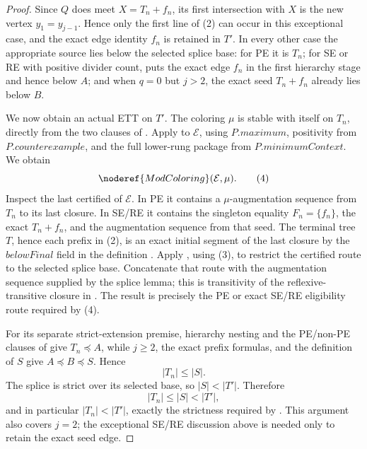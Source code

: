 \begin{proof}
Since \(Q\) does meet \(X=T_n+f_n\), its first intersection with \(X\)
is the new vertex \(y_1=y_{j-1}\).  Hence only the first line of (2) can
occur in this exceptional case, and the exact edge identity \(f_n\) is
retained in \(T'\).  In every other case the appropriate source lies
below the selected splice base: for PE it is \(T_n\); for SE or RE with
positive divider count,  puts the
exact edge \(f_n\) in the first hierarchy stage and hence below \(A\);
and when \(q=0\) but \(j>2\), the exact seed \(T_n+f_n\) already lies
below \(B\).                                                     

We now obtain an actual ETT on \(T'\).  The coloring \(\mu\) is stable
with itself on \(T_n\), directly from the two clauses of
.  Apply  to \(\mathcal E\), using
\(P.\mathit{maximum}\), positivity from
\(P.\mathit{counterexample}\), and the full lower-rung package from
\(P.\mathit{minimumContext}\).  We obtain
\[
                         \noderef{ModColoring}(\mathcal E,\mu).\tag{4}
\]
Inspect the last certified  of \(\mathcal E\).
In PE it contains a \(\mu\)-augmentation sequence from \(T_n\) to its
last closure.  In SE/RE it contains the singleton equality
\(F_n=\{f_n\}\), the exact 
\(T_n+f_n\), and the augmentation sequence from that seed.  The terminal
tree \(T\), hence each prefix in (2), is an exact initial segment of the
last closure by the \(\mathit{belowFinal}\) field in the definition
.  Apply
, using (3), to restrict
the certified route to the selected splice base.  Concatenate that route
with the augmentation sequence supplied by the splice lemma; this is
transitivity of the reflexive-transitive closure in
.  The result is precisely the PE
or exact SE/RE eligibility route required by (4).

For its separate strict-extension premise, hierarchy nesting and the
PE/non-PE clauses of  give
\(T_n\preccurlyeq A\), while \(j\ge2\), the exact prefix formulas, and the
definition of \(S\) give \(A\preccurlyeq B\preccurlyeq S\).  Hence
\[
                         |T_n|\le |S|.
\]
The splice is strict over its selected base, so \(|S|<|T'|\).  Therefore
\[
                         |T_n|\le |S|<|T'|,
\]
and in particular \(|T_n|<|T'|\), exactly the strictness required by
.  This argument also covers \(j=2\); the exceptional
SE/RE discussion above is needed only to retain the exact seed edge.


\end{proof}
